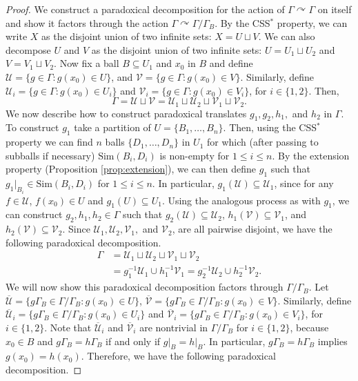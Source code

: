 \documentclass[12pt]{amsart}
\numberwithin{equation}{subsection}
\theoremstyle{definition}
\theoremstyle{definition}
\theoremstyle{remark}
\begin{document}
\begin{proof}
    We construct a paradoxical decomposition for the action of $\Gamma \curvearrowright \Gamma$ on itself and show it factors through the action $\Gamma \curvearrowright \Gamma / \Gamma_B$. By the CSS$^*$ property, we can write $X$ as the disjoint union of two infinite sets: $X = U \sqcup V$. We can also decompose $U$ and $V$ as the disjoint union of two infinite sets: $U = U_1 \sqcup U_2$ and $V = V_1 \sqcup V_2$. Now fix a ball $B \subseteq U_1$ and $x_0$ in $B$ and define $\mathcal U = \{g \in \Gamma : g(x_0) \in U \}$, and $\mathcal V = \{g \in \Gamma : g(x_0) \in V\}$.  Similarly, define $\mathcal U_i = \{g \in \Gamma : g(x_0) \in U_i \}$ and $\mathcal V_i = \{g \in \Gamma : g(x_0) \in V_i \}$, for $i \in \{1,2\}$. Then, 
 $$\Gamma = \mathcal U \sqcup \mathcal V = \mathcal U_1 \sqcup \mathcal U_2 \sqcup \mathcal V_1 \sqcup \mathcal V_2.$$
We now describe how to construct paradoxical translates $g_1, g_2, h_1,$ and $h_2$ in $\Gamma$. To construct $g_1$ take a partition of $ U = \{B_1, \dots, B_n\}$. Then, using the CSS$^*$ property we can find $n$ balls $\{ D_1, \dots, D_n\}$ in $ U_1$ for which (after passing to subballs if necessary) $\text{Sim}(B_i, D_i)$ is non-empty for $1 \leq i \leq n$. By the extension property (Proposition \ref{prop:extension}), we can then define $g_1$ such that $g_1\vert_{B_i} \in \text{Sim}(B_i,D_i)$ for $1\leq i \leq n$. In particular, $g_1(\mathcal U) \subseteq \mathcal U_1$, since for any $f\in \mathcal U$, $f(x_0) \in U$ and $g_1(U) \subseteq U_1$. Using the analogous process as with $g_1$, we can construct $g_2, h_1, h_2 \in \Gamma$ such that $g_2(\mathcal U) \subseteq \mathcal U_2$, $h_1(\mathcal V) \subseteq \mathcal V_1$, and $h_2(\mathcal V) \subseteq \mathcal V_2$. Since $\mathcal U_1, \mathcal U_2, \mathcal V_1,$ and $ \mathcal V_2$, are all pairwise disjoint,
we have the following paradoxical decomposition.
\begin{align*}
    \Gamma &= \mathcal U_1 \sqcup  \mathcal U_2  \sqcup \mathcal V_1 \sqcup  \mathcal V_2\\
    &=  g^{-1}_1\mathcal U_1\cup h^{-1}_1\mathcal V_1 = g^{-1}_2\mathcal U_2\cup h^{-1}_2\mathcal V_2. 
\end{align*}
We will now show this paradoxical decomposition factors through $\Gamma / \Gamma_B$. Let
$\overline{\mathcal U} = \{g\Gamma_B \in \Gamma / \Gamma_B: g(x_0) \in U  \}$, $\overline{\mathcal V} = \{g\Gamma_B \in \Gamma / \Gamma_B: g(x_0) \in V  \}$.  Similarly, define $\overline{\mathcal U}_i = \{g\Gamma_B \in \Gamma / \Gamma_B : g(x_0) \in U_i \}$ and $\overline{\mathcal V}_i = \{g\Gamma_B \in \Gamma / \Gamma_B : g(x_0) \in V_i \}$, for $i \in \{1,2\}$. Note that $\overline{\mathcal U}_i$ and $\overline{\mathcal V}_i$ are nontrivial in $\Gamma / \Gamma_B$ for $i \in \{1,2\}$, because $x_0 \in B$ and $g\Gamma_B = h\Gamma_B$ if and only if $g\vert_B = h\vert_B$. In particular, $g\Gamma_B = h\Gamma_B$ implies $g(x_0)=h(x_0)$. Therefore, we have the following paradoxical decomposition.

\end{proof}
\end{document}
